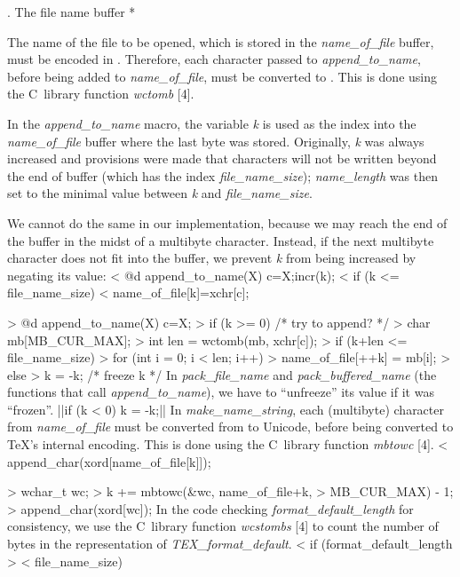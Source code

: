 . The file name buffer *

The name of the file to be opened, which is
stored in the {\it name\_of\_file\/} buffer,
must be encoded in \hbox{}.
Therefore, each character passed to {\it append\_to\_name\/},
before being added to {\it name\_of\_file\/},
must
be converted to \hbox{}. This is done using
the C~library function {\it wctomb\/} [4].

In the {\it append\_to\_name\/} macro, the variable
{\it k\/}
is used as the index into the {\it name\_of\_file\/} buffer
where the last byte was stored. Originally, {\it k\/} was
always increased and provisions were made
that characters will not be written beyond the end of buffer
(which has the index {\it file\_name\_size\/});
{\it name\_length\/} was then set to the minimal value
between {\it k\/} and {\it file\_name\_size\/}.

We cannot do the same in our implementation, because we may reach
the end of the buffer
in the midst of
a multibyte character. Instead, if the next multibyte
character does not fit into the buffer, we prevent {\it k\/} from
being increased by negating its value:
\verbatim
< @d append_to_name(X) { c=X;incr(k);
<   if (k <= file_name_size)
<     name_of_file[k]=xchr[c]; }

> @d append_to_name(X) { c=X;
>   if (k >= 0) { /* try to append? */
>     char mb[MB_CUR_MAX];
>     int len = wctomb(mb, xchr[c]);
>     if (k+len <= file_name_size)
>       for (int i = 0; i < len; i++)
>         name_of_file[++k] = mb[i];
>     else
>       k = -k; /* freeze k */ } }
\endverbatim
\medskip
In {\it pack\_file\_name\/} and {\it pack\_buffered\_name\/}
(the functions that call {\it append\_to\_name\/}),
we have to ``unfreeze'' its value
if it was ``frozen''.
||if (k < 0) k = -k;||
\medskip
In {\it make\_name\_string},
each (multibyte) character from {\it name\_of\_file\/}
must be converted from  to Unicode,
before being converted to \TeX's internal encoding.
This is done using the C~library function
{\it mbtowc\/} [4].
\verbatim
< append_char(xord[name_of_file[k]]);

> { wchar_t wc;
>   k += mbtowc(&wc, name_of_file+k,
>               MB_CUR_MAX) - 1;
>   append_char(xord[wc]); }
\endverbatim
\medskip
In the code checking {\it format\_default\_length\/}
for consistency, we
use the C~library function {\it wcstombs\/} [4] to count
the number of bytes in the  representation of
{\it TEX\_format\_default\/}.
\verbatim
< if (format_default_length >
<     file_name_size)

